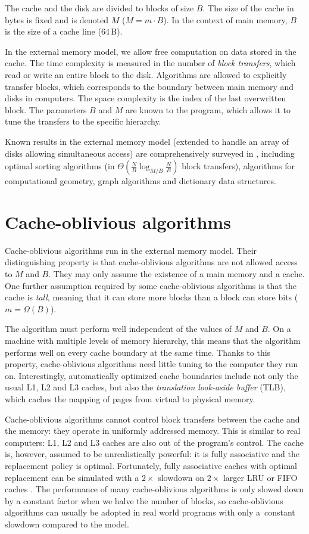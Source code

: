 The cache and the disk are divided to blocks of size $B$. The size of the cache 
in bytes is fixed and is denoted $M$ ($M=m\cdot B$).
In the context of main memory, $B$ is the size of a cache line
($64\,\text{B}$).

In the external memory model, we allow free computation on data
stored in the cache. The time complexity is measured in the number of
\emph{block transfers}, which read or write an entire block to the disk.
Algorithms are allowed to explicitly transfer blocks, which corresponds
to the boundary between main memory and disks in computers.
The space complexity is the index of the last overwritten block.
The parameters $B$ and $M$ are known to the program, which allows it to tune
the transfers to the specific hierarchy.

Known results in the external memory model (extended to handle an array
of disks allowing simultaneous access) are comprehensively surveyed in
\cite{em-ads}, including optimal sorting algorithms
(in $\Theta(\frac{N}{B}\log_{M/B}\frac{N}{B})$ block transfers),
algorithms for computational geometry, graph algorithms and dictionary
data structures.

\section{Cache-oblivious algorithms}
Cache-oblivious algorithms run in the external memory model.
Their distinguishing property is that cache-oblivious algorithms
are not allowed access to $M$ and $B$. They may only assume the existence
of a main memory and a cache.
One further assumption required by some cache-oblivious algorithms is
that the cache is \emph{tall}, meaning that it can store more blocks
than a block can store bits ($m=\Omega(B)$).

The algorithm must perform well independent of the values of $M$ and $B$.
On a machine with multiple levels of memory hierarchy, this means that
the algorithm performs well on every cache boundary at the same time.
Thanks to this property, cache-oblivious algorithms need little tuning to the
computer they run on. Interestingly, automatically optimized cache boundaries
include not only the usual L1, L2 and L3 caches, but also the \emph{translation
look-aside buffer} (TLB), which caches the mapping of pages from virtual to
physical memory.

Cache-oblivious algorithms cannot control block transfers between the cache
and the memory: they operate in uniformly addressed memory. This is similar
to real computers: L1, L2 and L3 caches are also out of the program's control.
The cache is, however, assumed to be unrealistically powerful: it is fully
associative and the replacement policy is optimal. Fortunately, fully
associative caches with optimal replacement can be simulated with a
$2\times$ slowdown on $2\times$ larger LRU or FIFO caches
\cite{sleator1985amortized}.
The performance of many cache-oblivious algorithms is only slowed down
by a constant factor when we halve the number of blocks, so cache-oblivious
algorithms can usually be adopted in real world programs with only a~constant
slowdown compared to the model.


